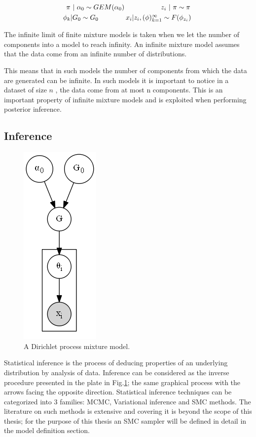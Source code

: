 \documentclass[twoside,hidelinks]{article}
\begin{document}
	\begin{equation}
		\begin{aligned}
			\centerline{ \textbf{$\pi$} $|$  $ \alpha_0  \sim GEM(\alpha_0 )\ \ \ \ \ \ \ \ \ \ \ \ \ \ \ \   z_i$ $|$ \textbf{$ \pi \sim \pi  $} } \\
			\centerline{$ \phi_k | G_0 \sim G_0 $\ \ \ \ \ \ \ \ \ \ \ \ $x_i | z_i, (\phi )_{k=1}^\infty \sim F(\phi_{z_i}) $  } \\
		\end{aligned}
	\end{equation}

The infinite limit of finite mixture models is taken when we let the number of components into a model to reach infinity. An infinite mixture model assumes that the data come from an infinite number of distributions.

This means that in such models the number of components from which the data are generated can be infinite. In such models it is important to notice in a dataset of size $n$ , the data come from at most n components. This is an important property of infinite mixture models and is exploited when performing posterior inference.

\subsection{Inference}
\begin{figure}
          \centerline{\includegraphics[width=.17\textwidth]{dpmm3}}
	\caption{A Dirichlet process mixture model.}
	\label{mm}
\end{figure}


Statistical inference is the process of deducing properties of an underlying distribution by analysis of data. Inference can be considered as the inverse procedure presented in the plate in Fig.\ref{mm}; the same graphical process with the arrows facing the opposite direction. Statistical inference techniques can be categorized into 3 families: MCMC, Variational inference and SMC methods. The literature on such methods is extensive and covering it is beyond the scope of this thesis; for the purpose of this thesis an SMC sampler will be defined in detail in the model definition section. 
\end{document}
